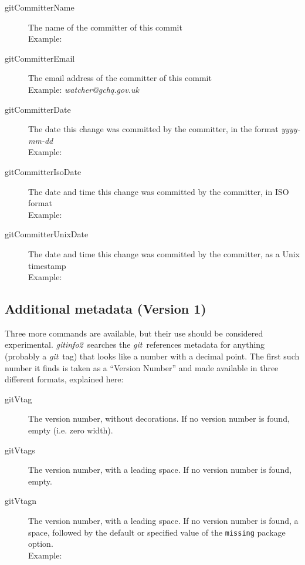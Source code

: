 \documentclass[draft,a4paper,12pt,twoside,openany]{memoir}
\makeatletter
\newcommand{\sfit}[1]{\textit{#1}}
\newcommand{\git}{\sfit{git}}
\newcommand*{\emailat}{@}
\newcommand{\tpname}{\sfit{gitinfo2}}
\makeatother
\begin{document}
\begin{description}
\item[gitCommitterName]
    The name of the committer of this commit\\
    Example: \textit{\gitCommitterName}

\item[gitCommitterEmail]
    The email address of the committer of this commit\\
    Example: \textit{watcher\emailat gchq.gov.uk}

\item[gitCommitterDate]
    The date this change was committed by the committer,
    in the format \textit{yyyy-mm-dd}\\
    Example: \textit{\gitCommitterDate}

\item[gitCommitterIsoDate]
    The date and time this change was committed by the committer,
    in ISO format\\
    Example: \textit{\gitCommitterIsoDate}

\item[gitCommitterUnixDate]
    The date and time this change was committed by the committer,
    as a Unix timestamp\\
    Example: \textit{\gitCommitterUnixDate}

\end{description}


\subsection{Additional metadata (Version 1)}

Three more commands are available, but their use should be considered
experimental. \tpname\ searches the \git\ references metadata for
anything (probably a \git\ tag) that looks like a number with a decimal point.
The first such number it finds is taken as a ``Version Number''
and made available in three different formats, explained here:

\begin{description}
\item[gitVtag]
    The version number, without decorations. If no version number is found,
    empty (i.e. zero width).
\item[gitVtags]
    The version number, with a leading space. If no version number is found,
    empty.
\item[gitVtagn]
    The version number, with a leading space.
    If no version number is found, a space,
    followed by the default or specified value of
    the \texttt{missing} package option.\\
    Example: \textit{\gitVtagn}
\end{description}
\end{document}

